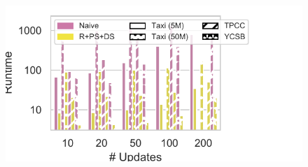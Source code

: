 \begin{figure}[t]
\begin{minipage}[b]{0.29\linewidth}
               \centering
               \includegraphics[width=1.1\linewidth,trim=0            0 0                                     0,                             clip]{imgs/felix_naive.pdf}              \\

\end{minipage}
\end{figure}
